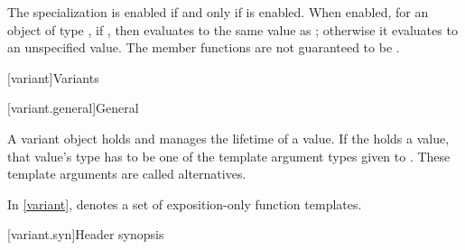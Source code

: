 \begin{itemdescr}
\pnum
The specialization  is enabled
if and only if  is enabled.
When enabled, for an object  of type ,
if , then 
evaluates to the same value as ;
otherwise it evaluates to an unspecified value.
The member functions are not guaranteed to be .
\end{itemdescr}


[variant]{Variants}

[variant.general]{General}

\pnum
A variant object holds and manages the lifetime of a value.
If the  holds a value, that value's type has to be one
of the template argument types given to .
These template arguments are called alternatives.

\pnum
In \ref{variant},
 denotes
a set of exposition-only function templates.

[variant.syn]{Header  synopsis}
%

